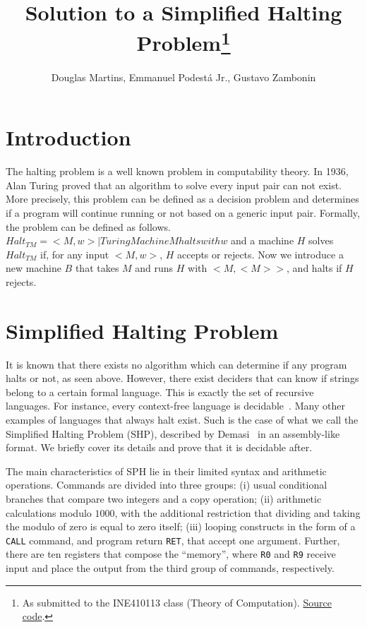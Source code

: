 \documentclass[12pt]{article}
\title{Solution to a Simplified Halting Problem\footnote{
    As submitted to the INE410113 class (Theory of Computation). \href{https://github.com/zambonin/ine410113}{Source code}.}}
\author{Douglas Martins\inst{1}, Emmanuel Podestá Jr.\inst{1}, Gustavo Zambonin\inst{1}}
\begin{document}
 

\maketitle

\section{Introduction}\label{sec:intro}

The halting problem is a well known problem in computability theory. In 1936, Alan Turing proved that an algorithm to solve every input pair can not exist. More precisely, this problem can be defined as a decision problem and determines if a program will continue running or not based on a generic input pair. Formally, the problem can be defined as follows. $Halt_{TM} = {<M, w> | Turing Machine M halts with w}$ and a machine $H$ solves $Halt_{TM}$ if, for any input $<M,w>$, $H$ accepts or rejects. Now we introduce a new machine $B$ that takes $M$ and runs $H$ with $<M, <M>>$, and halts if $H$ rejects.

\section{Simplified Halting Problem}\label{sec:halting}

It is known that there exists no algorithm which can determine if any program halts or not, as seen above. However, there exist deciders that can know if strings belong to a certain formal language. This is exactly the set of recursive languages. For instance, every context-free language is decidable~\cite[Theorem 4.9]{Sipser:book:2012}. Many other examples of languages that always halt exist. Such is the case of what we call the Simplified Halting Problem (SHP), described by Demasi~\cite{Demasi:misc:2013:may} in an assembly-like format. We briefly cover its details and prove that it is decidable after.

The main characteristics of SPH lie in their limited syntax and arithmetic operations. Commands are divided into three groups: (i) usual conditional branches that compare two integers and a copy operation; (ii) arithmetic calculations modulo $1000$, with the additional restriction that dividing and taking the modulo of zero is equal to zero itself; (iii) looping constructs in the form of a \texttt{CALL} command, and program return \texttt{RET}, that accept one argument. Further, there are ten registers that compose the ``memory'', where \texttt{R0} and \texttt{R9} receive input and place the output from the third group of commands, respectively.
\end{document}
